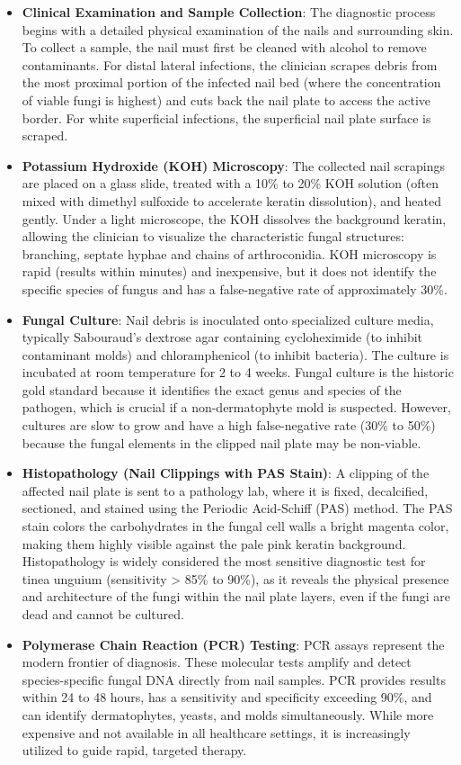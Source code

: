 \begin{itemize}
    \item \textbf{Clinical Examination and Sample Collection}: The diagnostic process begins with a detailed physical examination of the nails and surrounding skin. To collect a sample, the nail must first be cleaned with alcohol to remove contaminants. For distal lateral infections, the clinician scrapes debris from the most proximal portion of the infected nail bed (where the concentration of viable fungi is highest) and cuts back the nail plate to access the active border. For white superficial infections, the superficial nail plate surface is scraped.
    \item \textbf{Potassium Hydroxide (KOH) Microscopy}: The collected nail scrapings are placed on a glass slide, treated with a 10\% to 20\% KOH solution (often mixed with dimethyl sulfoxide to accelerate keratin dissolution), and heated gently. Under a light microscope, the KOH dissolves the background keratin, allowing the clinician to visualize the characteristic fungal structures: branching, septate hyphae and chains of arthroconidia. KOH microscopy is rapid (results within minutes) and inexpensive, but it does not identify the specific species of fungus and has a false-negative rate of approximately 30\%.
    \item \textbf{Fungal Culture}: Nail debris is inoculated onto specialized culture media, typically Sabouraud's dextrose agar containing cycloheximide (to inhibit contaminant molds) and chloramphenicol (to inhibit bacteria). The culture is incubated at room temperature for 2 to 4 weeks. Fungal culture is the historic gold standard because it identifies the exact genus and species of the pathogen, which is crucial if a non-dermatophyte mold is suspected. However, cultures are slow to grow and have a high false-negative rate (30\% to 50\%) because the fungal elements in the clipped nail plate may be non-viable.
    \item \textbf{Histopathology (Nail Clippings with PAS Stain)}: A clipping of the affected nail plate is sent to a pathology lab, where it is fixed, decalcified, sectioned, and stained using the Periodic Acid-Schiff (PAS) method. The PAS stain colors the carbohydrates in the fungal cell walls a bright magenta color, making them highly visible against the pale pink keratin background. Histopathology is widely considered the most sensitive diagnostic test for tinea unguium (sensitivity > 85\% to 90\%), as it reveals the physical presence and architecture of the fungi within the nail plate layers, even if the fungi are dead and cannot be cultured.
    \item \textbf{Polymerase Chain Reaction (PCR) Testing}: PCR assays represent the modern frontier of diagnosis. These molecular tests amplify and detect species-specific fungal DNA directly from nail samples. PCR provides results within 24 to 48 hours, has a sensitivity and specificity exceeding 90\%, and can identify dermatophytes, yeasts, and molds simultaneously. While more expensive and not available in all healthcare settings, it is increasingly utilized to guide rapid, targeted therapy.
\end{itemize}

